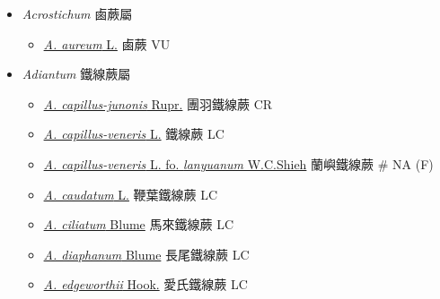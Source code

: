 
  \begin{itemize}
 \item[    ] \textit{Acrostichum} 鹵蕨屬
                                
  \begin{itemize}
        \item[] \href{http://www.theplantlist.org/tpl1.1/search?q=Acrostichum+aureum}{\textit{A. aureum} L.}   鹵蕨   VU
  \end{itemize}
 \item[    ] \textit{Adiantum} 鐵線蕨屬
                                
  \begin{itemize}
        \item[] \href{http://www.theplantlist.org/tpl1.1/search?q=Adiantum+capillus-junonis}{\textit{A. capillus-junonis} Rupr.}   團羽鐵線蕨   CR
        \item[] \href{http://www.theplantlist.org/tpl1.1/search?q=Adiantum+capillus-veneris}{\textit{A. capillus-veneris} L.}   鐵線蕨   LC
        \item[] \href{http://www.theplantlist.org/tpl1.1/search?q=Adiantum+capillus-veneris+fo.+lanyuanum}{\textit{A. capillus-veneris} L. fo. \textit{lanyuanum} W.C.Shieh}  
                                        蘭嶼鐵線蕨  \# NA (F)
        \item[] \href{http://www.theplantlist.org/tpl1.1/search?q=Adiantum+caudatum}{\textit{A. caudatum} L.}   鞭葉鐵線蕨   LC
        \item[] \href{http://www.theplantlist.org/tpl1.1/search?q=Adiantum+ciliatum}{\textit{A. ciliatum} Blume}   馬來鐵線蕨   LC
        \item[] \href{http://www.theplantlist.org/tpl1.1/search?q=Adiantum+diaphanum}{\textit{A. diaphanum} Blume}   長尾鐵線蕨   LC
        \item[] \href{http://www.theplantlist.org/tpl1.1/search?q=Adiantum+edgeworthii}{\textit{A. edgeworthii} Hook.}   愛氏鐵線蕨   LC

\end{itemize}
\end{itemize}
